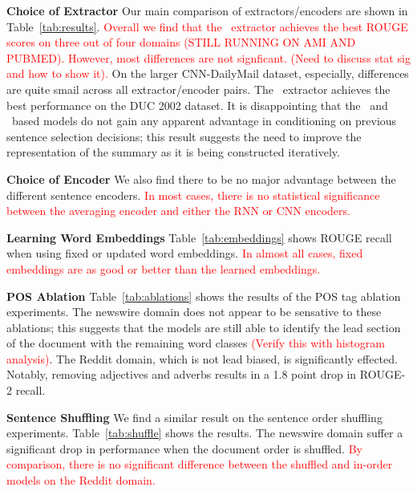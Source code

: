 

\textbf{Choice of Extractor} Our main comparison of extractors/encoders are shown in 
Table~\ref{tab:results}.
\textcolor{red}{Overall we find that the \modelTwoBF~extractor achieves the 
best ROUGE scores on three out of four domains (STILL RUNNING ON AMI AND PUBMED). 
However, most
differences are not signficant. (Need to discuss stat sig and how to show it).}
On the larger CNN-DailyMail dataset, especially, 
differences are quite smail across all extractor/encoder pairs.
The \baselineOneBF~extractor achieves the best performance on the DUC 2002
dataset. It is disappointing that the \baselineOneBF~and \baselineTwoBF~based 
models do not gain any apparent advantage in conditioning on previous 
sentence selection decisions; this result suggests the need to improve
the representation of the summary as it is being constructed iteratively.

\textbf{Choice of Encoder} We also find there to be no major advantage 
between the different sentence encoders. \textcolor{red}{In most cases,
there is no statistical significance between the averaging encoder and either
the RNN or CNN encoders.} 


\textbf{Learning Word Embeddings} Table~\ref{tab:embeddings} shows ROUGE recall
when using fixed or updated word embeddings. \textcolor{red}{In almost all
cases, fixed embeddings are as good or better than the learned embeddings.}



\textbf{POS Ablation} Table~\ref{tab:ablations} shows the results of the POS
tag ablation experiments. The newswire domain does not appear to be sensative
to these ablations; this suggests that the models are still able to identify
the lead section of the document with the remaining word classes \textcolor{red}{(Verify this with histogram analysis)}. 
The Reddit domain, which is not lead biased, is significantly effected.
Notably, removing adjectives and adverbs results in a 1.8 point drop 
in ROUGE-2 recall. 


\textbf{Sentence Shuffling} We find a similar result on the sentence order
shuffling experiments. Table~\ref{tab:shuffle} shows the results. 
The newswire domain suffer a significant drop in performance 
when the document order is shuffled. \textcolor{red}{By comparison, there is no significant difference between the shuffled and in-order models on 
the Reddit domain.} 


